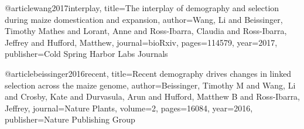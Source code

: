 @article{wang2017interplay,
  title={The interplay of demography and selection during maize domestication and expansion},
  author={Wang, Li and Beissinger, Timothy Mathes and Lorant, Anne and Ross-Ibarra, Claudia and Ross-Ibarra, Jeffrey and Hufford, Matthew},
  journal={bioRxiv},
  pages={114579},
  year={2017},
  publisher={Cold Spring Harbor Labs Journals}
}

@article{beissinger2016recent,
  title={Recent demography drives changes in linked selection across the maize genome},
  author={Beissinger, Timothy M and Wang, Li and Crosby, Kate and Durvasula, Arun and Hufford, Matthew B and Ross-Ibarra, Jeffrey},
  journal={Nature Plants},
  volume={2},
  pages={16084},
  year={2016},
  publisher={Nature Publishing Group}
}

